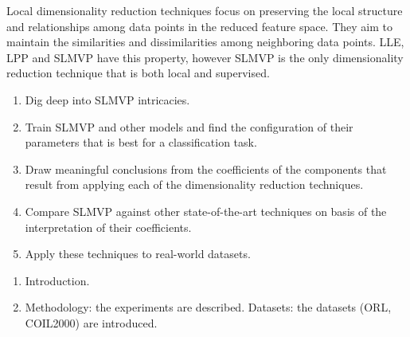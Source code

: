 Local dimensionality reduction techniques focus on preserving the local structure and relationships among data points in the reduced feature space. They aim to maintain the similarities and dissimilarities among neighboring data points. LLE, LPP and SLMVP have this property, however SLMVP is the only dimensionality reduction technique that is both local and supervised.



\begin{enumerate}
    \item Dig deep into SLMVP intricacies.
    \item Train SLMVP and other models and find the configuration of their parameters that is best for a classification task.
    \item Draw meaningful conclusions from the coefficients of the components that result from applying each of the dimensionality reduction techniques.
    \item Compare SLMVP against other state-of-the-art techniques on basis of the interpretation of their coefficients.
    \item Apply these techniques to real-world datasets.
\end{enumerate}


\begin{enumerate}
    \item Introduction.
    \item Methodology: the experiments are described.
          \subitem Datasets: the datasets (ORL, COIL2000) are introduced.
\end{enumerate}